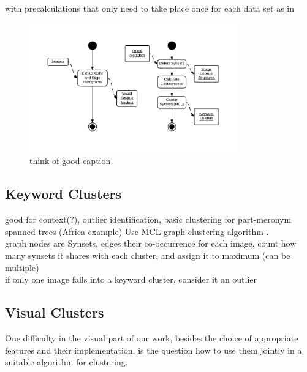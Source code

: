 with precalculations that only need to take place once for each data set as in

\begin{figure}[h]
\centering
\includegraphics[width=0.8\textwidth]{images/precalcs_activity_diagram.pdf}
\caption{think of good caption}
\end{figure}


\subsection{Keyword Clusters}
\label{sec_keywordclustering}
good for context(?), outlier identification, basic clustering for part-meronym spanned trees (Africa example)
\bigskip
Use MCL graph clustering algorithm\cite{Dongen1998} .\\
graph nodes are Synsets, edges their co-occurrence
\bigskip
for each image, count how many synsets it shares with each cluster, and assign it to maximum (can be multiple)\\
if only one image falls into a keyword cluster, consider it an outlier

\subsection{Visual Clusters}
\label{sec_visualclustering}

One difficulty in the visual part of our work, besides the choice of appropriate features and their implementation, is the question how to use them jointly in a suitable algorithm for clustering. 

